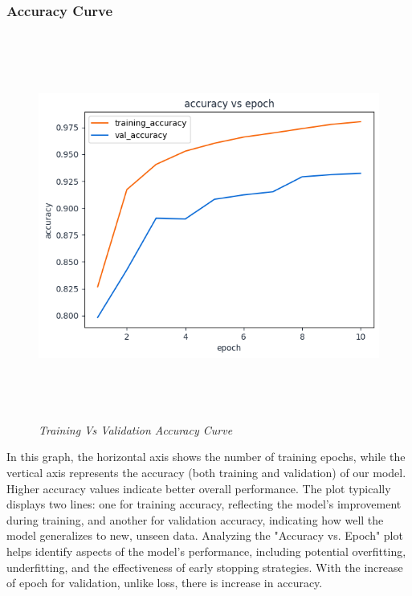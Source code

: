 \newpage
\subsubsection{Accuracy Curve}
\begin{figure}[ht]
    \centering
    \includegraphics[width=5in, height =5in ]{img/accuracyVsepoch.png}
    \caption{\textit{Training Vs Validation Accuracy Curve }}
\end{figure}
In this graph, the horizontal axis shows the number of training epochs, while the vertical axis represents the accuracy (both training and validation) of our model. Higher accuracy values indicate better overall performance. The plot typically displays two lines: one for training accuracy, reflecting the model's improvement during training, and another for validation accuracy, indicating how well the model generalizes to new, unseen data. Analyzing the "Accuracy vs. Epoch" plot helps identify aspects of the model's performance, including potential overfitting, underfitting, and the effectiveness of early stopping strategies.
With the increase of epoch for validation, unlike loss, there is increase in accuracy.
\newpage

